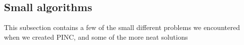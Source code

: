 \subsection{Small algorithms}
	This subsection contains a few of the small different problems we encountered when we
 	created PINC, and some of the more neat solutions
